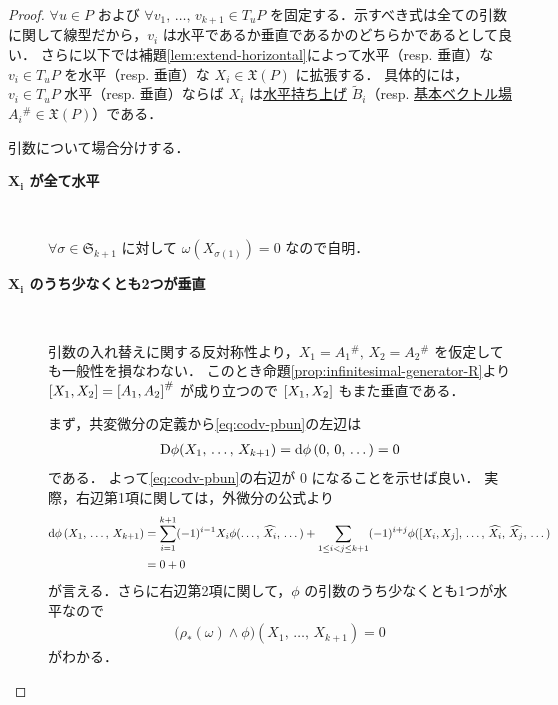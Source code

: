 \documentclass[geometry_main]{subfiles}
\begin{document}
\begin{proof}
    $\forall u \in P$ および $\forall v_1,\, \dots,\, v_{k+1} \in T_u P$ を固定する．示すべき式は全ての引数に関して線型だから，$v_i$ は水平であるか垂直であるかのどちらかであるとして良い．
    さらに以下では補題\ref{lem:extend-horizontal}によって水平（resp. 垂直）な $v_i \in T_u P$ を水平（resp. 垂直）な $X_i \in \mathfrak{X}(P)$ に拡張する．
    具体的には，$v_i \in T_u P$ 水平（resp. 垂直）ならば $X_i$ は\hyperref[def:horizontal-lift-vecf]{水平持ち上げ} $\tilde{B}_i$（resp. \hyperref[def:fundamental-vecf]{基本ベクトル場} $A_i{}^\# \in \mathfrak{X}(P)$）である．
    
    引数について場合分けする．
    \begin{description}
        \item[\textbf{$\bm{X_i}$ が全て水平}]　
        
        $\forall \sigma \in \mathfrak{S}_{k+1}$ に対して $\omega(X_{\sigma(1)}) = 0$ なので自明．

        \item[\textbf{$\bm{X_i}$ のうち少なくとも2つが垂直}]　
        
        引数の入れ替えに関する反対称性より，$X_1 = A_1{}^\#,\, X_2 = A_2{}^\#$ を仮定しても一般性を損なわない．
        このとき命題\ref{prop:infinitesimal-generator-R}より $\comm{X_1}{X_2} = \comm{A_1}{A_2}^\#$ が成り立つので $\comm{X_1}{X_2}$ もまた垂直である．
        
        まず，共変微分の定義から\eqref{eq:codv-pbun}の左辺は
        \begin{align}
            \mathrm{D}\phi(X_1,\, \dots,\, X_{k+1}) = \dd{\phi}(0,\, 0,\, \dots) = 0
        \end{align}
        である．
        よって\eqref{eq:codv-pbun}の右辺が $0$ になることを示せば良い．
        実際，右辺第1項に関しては，外微分の公式より
        \begin{align}
            \dd{\phi}(X_1,\, \dots,\, X_{k+1})
            &= \sum_{i=1}^{k+1} (-1)^{i-1} X_i \phi(\dots,\, \widehat{X_i},\, \dots) 
            + \sum_{1 \le i < j \le k+1} (-1)^{i+j} \phi(\comm{X_i}{X_j},\, \dots,\, \widehat{X_i},\, \widehat{X_j},\, \dots) \label{eq:extdv-global} \\
            &= 0 + 0
        \end{align}
        が言える．さらに右辺第2項に関して，$\phi$ の引数のうち少なくとも1つが水平なので
        \begin{align}
            \bigl(\rho_* (\omega) \wedge \phi\bigr) (X_1,\, \dots,\, X_{k+1}) = 0
        \end{align}
        がわかる．


\end{description}
\end{proof}
\end{document}
